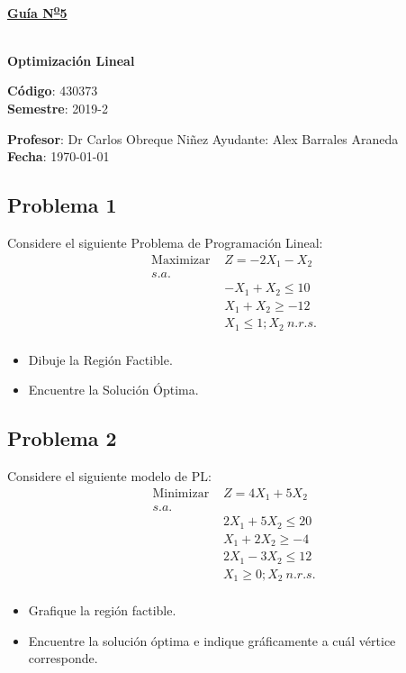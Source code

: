 \documentclass[letterpaper]{article}
\begin{document}
\vspace*{0.5\baselineskip}
\begin{center}
\begin{Large}
\textbf{\underline{Guía N\textsuperscript{\underline{o}}5}}
\end{Large}\\
\vspace*{0.5\baselineskip}
\textbf{Optimización Lineal} \\
\vspace*{0.5\baselineskip}
\begin{footnotesize}
\textbf{Código}: 430373\\
\textbf{Semestre}: 2019-2
\end{footnotesize}
\end{center}

\noindent \textbf{Profesor}: Dr Carlos Obreque Niñez  \hfill Ayudante: Alex Barrales Araneda\\
\noindent \textbf{Fecha}: \today

\subsection*{Problema 1}
Considere el siguiente Problema de Programación Lineal:
\begin{align*}
\mbox{Maximizar }&Z = -2X_1 - X_2\\
s.a.\\
&-X_1 + X_2 \leq 10\\
&X_1 + X_2 \geq -12\\
&X_1 \leq 1 ; X_2\: n.r.s.\\
\end{align*}

\begin{itemize}
\item Dibuje la Región Factible.
\item Encuentre la Solución Óptima.
\end{itemize}

\subsection*{Problema 2}
Considere el siguiente modelo de PL:
\begin{align*}
\mbox{Minimizar }&Z = 4X_1 + 5X_2\\
s.a.\\
&2X_1 + 5X_2 \leq 20\\
&X_1 + 2X_2 \geq -4\\
&2X_1 - 3X_2 \leq 12\\
&X_1 \geq 0 ; X_2\: n.r.s.\\
\end{align*}
\begin{itemize}
\item Grafique la región factible.
\item Encuentre la solución óptima e indique gráficamente a cuál vértice corresponde.
\end{itemize}
\end{document}
